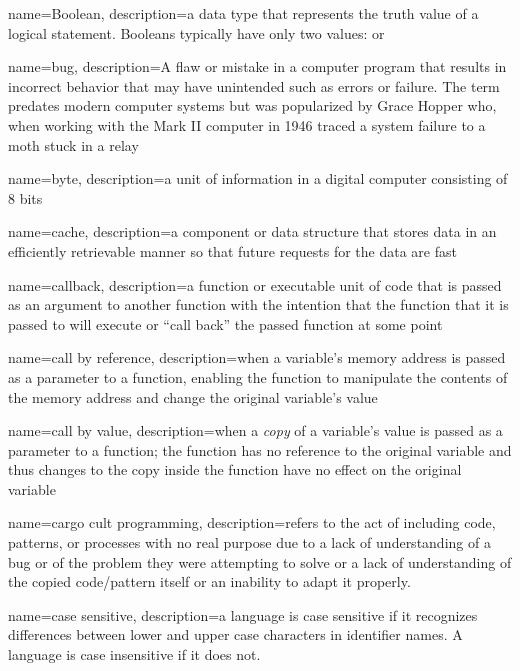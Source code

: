 {
  name=Boolean,
  description={a data type that represents the truth value of a logical statement.  Booleans typically have only two 
  	values: \True or \False}
}

{
  name=bug,
  description={A flaw or mistake in a computer program that results in incorrect behavior that may have unintended such as errors or failure.  The
  	term predates modern computer systems but was popularized by Grace Hopper who, when working with the Mark II computer in 1946 traced
  	a system failure to a moth stuck in a relay}
}

{
  name=byte,
  description={a unit of information in a digital computer consisting of 8 bits}
}

{
  name=cache,
  description={a component or data structure that stores data in an efficiently retrievable manner so that future requests for the data are fast}
}

{
  name=callback,
  description={a function or executable unit of code that is passed as an argument to another function with the intention that the function that it is passed to will execute or ``call back'' the passed function at some point}
}

{
  name=call by reference,
  description={when a variable's memory address is passed as a parameter to a function, enabling the function to manipulate the contents of the memory address and change the original variable's value}
}

{
  name=call by value,
  description={when a \emph{copy} of a variable's value is passed as a parameter to a function; the function has no reference to the original variable and thus changes to the copy inside the function have no effect on the original variable}
}

{
  name=cargo cult programming,
  description={refers to the act of including code, patterns, or processes with no real purpose due to a lack of understanding of a bug or of the problem they were attempting to solve or a lack of understanding of the copied code/pattern itself or an inability to adapt it properly.}
}

{
  name=case sensitive,
  description={a language is case sensitive if it recognizes differences between lower and upper case characters in 
  	identifier names.  A language is case insensitive if it does not.}
}

